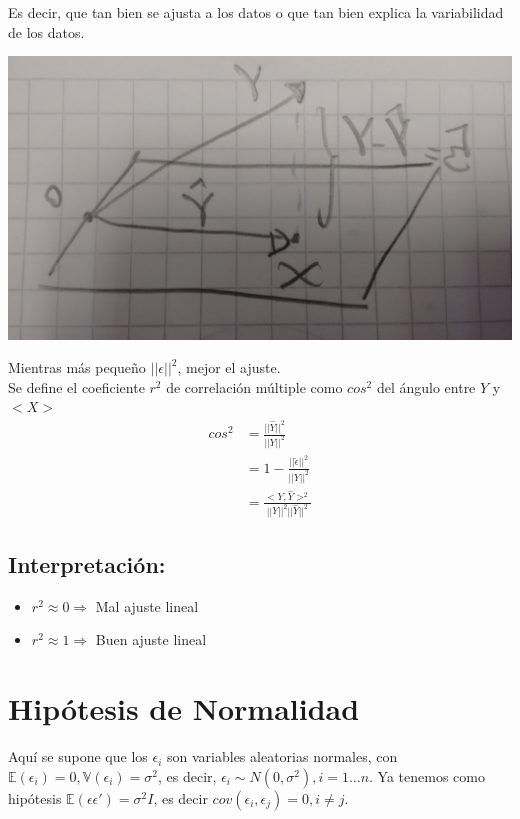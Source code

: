 \documentclass[10pt]{article}
\theoremstyle{plain}
\theoremstyle{definition}
\begin{document}
Es decir, que tan bien se ajusta a los datos o que tan bien explica la variabilidad de los datos.
\begin{center}
\includegraphics[scale=0.1]{imagenes/proyeccion.jpg}
\end{center}
Mientras más pequeño $||\epsilon||^2$, mejor el ajuste.\\

Se define el coeficiente $r^2$ de correlación múltiple como $cos^2$ del ángulo entre $Y$ y $<X>$
\begin{align*}
cos^2 &= \frac{||\hat{Y}||^2}{||Y||^2}\\
&= 1-\frac{||\hat{\epsilon}||^2}{||Y||^2}\\
&= \frac{<Y,\hat{Y}>^2}{||Y||^2||\hat{Y}||^2}
\end{align*}
\subsection{Interpretación:}
\begin{itemize}
\item $r^2 \approx 0 \Rightarrow$ Mal ajuste lineal
\item $r^2 \approx 1 \Rightarrow$ Buen ajuste lineal
\end{itemize}

\section{Hipótesis de Normalidad}
Aquí se supone que los $\epsilon_{i}$ son variables aleatorias normales, con $\mathbb{E}(\epsilon_{i}) = 0, \mathbb{V}(\epsilon_{i}) = \sigma^2$, es decir, $\epsilon_{i} \sim N(0,\sigma^2), i = 1\ldots n$. Ya tenemos como hipótesis $\mathbb{E}(\epsilon\epsilon') = \sigma^2I$, es decir $cov(\epsilon_{i},\epsilon_{j})=0, i\not = j$.\\
\end{document}
